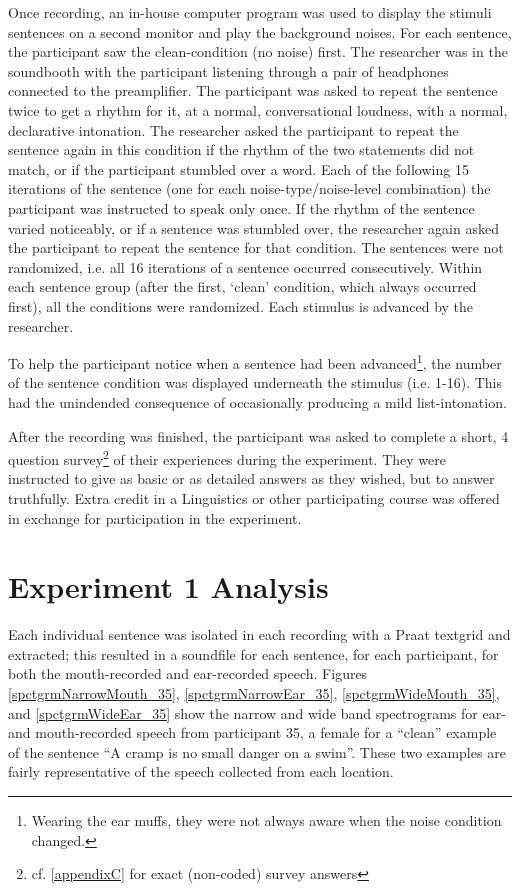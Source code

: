 \documentclass[dissertation,copyright]{uathesis}
\begin{document}
Once recording, an in-house computer program was used to display the stimuli sentences on a second monitor and play the background noises.  For each sentence, the participant saw the clean-condition (no noise) first.  The researcher was in the soundbooth with the participant listening through a pair of headphones connected to the preamplifier.  The participant was asked to repeat the sentence twice to get a rhythm for it, at a normal, conversational loudness, with a normal, declarative intonation.  The researcher asked the participant to repeat the sentence again in this condition if the rhythm of the two statements did not match, or if the participant stumbled over a word.  Each of the following 15 iterations of the sentence (one for each noise-type/noise-level combination) the participant was instructed to speak only once.  If the rhythm of the sentence varied noticeably, or if a sentence was stumbled over, the researcher again asked the participant to repeat the sentence for that condition.  The sentences were not randomized, i.e. all 16 iterations of a sentence occurred consecutively. Within each sentence group (after the first, `clean' condition, which always occurred first), all the conditions were randomized. Each stimulus is advanced by the researcher.

To help the participant notice when a sentence had been advanced\footnote{Wearing the ear muffs, they were not always aware when the noise condition changed.}, the number of the sentence condition was displayed underneath the stimulus (i.e. 1-16).  This had the unindended consequence of occasionally producing a mild list-intonation. 

After the recording was finished, the participant was asked to complete a short, 4 question survey\footnote{cf. \ref{appendixC} for exact (non-coded) survey answers} of their experiences during the experiment.  They were instructed to give as basic or as detailed answers as they wished, but to answer truthfully.  Extra credit in a Linguistics or other participating course was offered in exchange for participation in the experiment.

\section{Experiment 1 Analysis}

Each individual sentence was isolated in each recording with a Praat textgrid and extracted; this resulted in a soundfile for each sentence, for each participant, for both the mouth-recorded and ear-recorded speech.  Figures \ref{spctgrmNarrowMouth_35}, \ref{spctgrmNarrowEar_35}, \ref{spctgrmWideMouth_35}, and \ref{spctgrmWideEar_35} show the narrow and wide band spectrograms for ear- and mouth-recorded speech from participant 35, a female for a ``clean'' example of the sentence ``A cramp is no small danger on a swim''.  These two examples are fairly representative of the speech collected from each location.
\end{document}
